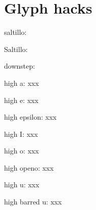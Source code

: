 
\section{Glyph hacks}
saltillo: {\saltillo} {\ꞌ}

Saltillo: {\Saltillo} {\Ꞌ}

downstep: {\downstep} \↓

high a:  xxx{\higha}

high e: xxx{\highe}

high epsilon: xxx{\highE}

high I: xxx{\highI}

high o: xxx{\higho}

high openo: xxx{\highO}

high u: xxx{\highu}

high barred u:  xxx{\highU}

